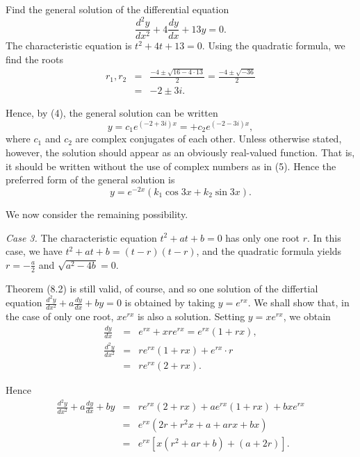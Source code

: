 \begin{example}
Find the general solution of the differential equation
$$
\frac{d^{2}y}{dx^2} + 4 \frac{dy}{dx} + 13y = 0.
$$
The characteristic equation is $t^2 + 4t + 13 = 0$. Using the quadratic formula, we find the roots
\begin{eqnarray*}
r_1, r_2 &=& \frac{- 4 \pm \sqrt{16 - 4 \cdot 13}}{2} = \frac{- 4 \pm \sqrt{-36}}{2}\\
             &=& -2 \pm 3i.
\end{eqnarray*}

Hence, by (4), the general solution can be written
$$
y = c_{1}e^{(-2+3i)x}= + c_{2}e^{(-2-3i)x},
$$
\noindent where $c_1$ and $c_2$ are complex conjugates of each other. Unless otherwise stated, however, the solution should appear as an obviously real-valued
function. That is, it should be written without the use of complex numbers as in (5). Hence the
preferred form of the general solution is
$$
y = e^{-2x}(k_{1} \cos 3x + k_{2} \sin 3x).
$$
\end{example}

We now consider the remaining possibility.
\medskip

\textit{Case 3.} The characteristic equation $t^2 + at + b = 0$ has only one root $r$. In this case, 
we have $t^2 + at + b = (t - r)(t - r)$, and the quadratic formula yields $r = - \frac{a}{2}$ and $\sqrt{a^2 - 4b} = 0$.

Theorem (8.2) is still valid, of course, and so one solution of the differtial equation $\frac{d^{2}y}{dx^2} + a \frac{dy}{dx} + by = 0$ is obtained by taking $y = e^{rx}$. 
We shall show that, in the case of only one root, 
$xe^{rx}$ is also a solution. Setting $y = xe^{rx}$, we obtain
\begin{eqnarray*}
          \frac{dy}{dx} &=& e^{rx} + xre^{rx} = e^{rx} (1 + rx),\\
\frac{d^{2}y}{dx^2} &=& re^{rx}(1 + rx) + e^{rx} \cdot r\\
                              &=& re^{rx} (2 + rx).
\end{eqnarray*}

\noindent Hence 
\begin{eqnarray*}
\frac{d^{2}y}{dx^2} + a \frac{dy}{dx} + by &=& re^{rx}(2 + rx) + ae^{rx}(1 + rx) + bxe^{rx}\\
&=& e^{rx}(2r + r^{2}x + a + arx + bx) \\
&=& e^{rx}[x(r^2 + ar + b) + (a + 2r)].
\end{eqnarray*}

